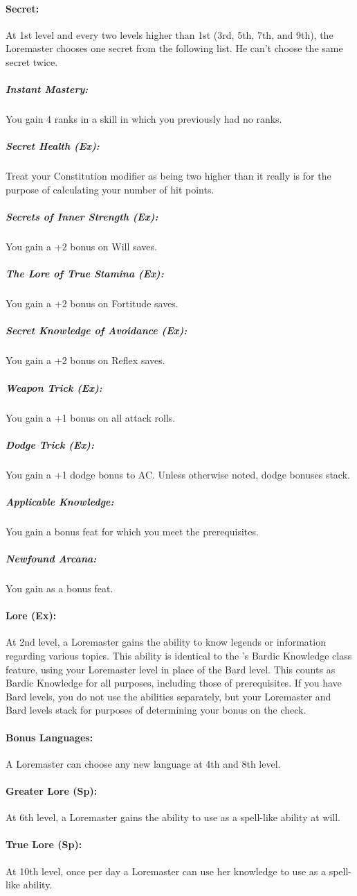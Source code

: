 \paragraph{Secret:}
At 1st level and every two levels higher than 1st (3rd, 5th, 7th, and 9th), the Loremaster chooses one secret from the following list.
He can't choose the same secret twice.

\subparagraph{Instant Mastery:}
You gain 4 ranks in a skill in which you previously had no ranks.\\
\subparagraph{Secret Health (Ex):}
Treat your Constitution modifier as being two higher than it really is for the purpose of calculating your number of hit points.
\subparagraph{Secrets of Inner Strength (Ex):}
You gain a +2 bonus on Will saves.
\subparagraph{The Lore of True Stamina (Ex):}
You gain a +2 bonus on Fortitude saves.
\subparagraph{Secret Knowledge of Avoidance (Ex):}
You gain a +2 bonus on Reflex saves.
\subparagraph{Weapon Trick (Ex):}
You gain a +1 bonus on all attack rolls.
\subparagraph{Dodge Trick (Ex):}
You gain a +1 dodge bonus to AC. Unless otherwise noted, dodge bonuses stack.
\subparagraph{Applicable Knowledge:}
You gain a bonus feat for which you meet the prerequisites.
\subparagraph{Newfound Arcana:}
You gain  as a bonus feat.

\paragraph{Lore (Ex):}
At 2nd level, a Loremaster gains the ability to know legends or information regarding various topics. This ability is identical to the 's Bardic Knowledge class feature, using your Loremaster level in place of the Bard level. This counts as Bardic Knowledge for all purposes, including those of prerequisites. If you have Bard levels, you do not use the abilities separately, but your Loremaster and Bard levels stack for purposes of determining your bonus on the check.

\paragraph{Bonus Languages:}
A Loremaster can choose any new language at 4th and 8th level.

\paragraph{Greater Lore (Sp):}
At 6th level, a Loremaster gains the ability to use  as a spell-like ability at will.

\paragraph{True Lore (Sp):}
At 10th level, once per day a Loremaster can use her knowledge to use  as a spell-like ability.